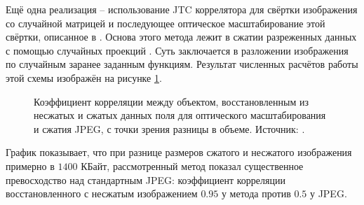 \FloatBarrier\par
Ещё одна реализация -- использование JTC коррелятора для свёртки изображения со случайной матрицей \cite{velez2016optical} и последующее оптическое масштабирование этой свёртки, описанное в \cite{trejos2016optical}. Основа этого метода лежит в сжатии разреженных данных с помощью случайных проекций \cite{amador2007random}. Суть заключается в разложении изображения по случайным заранее заданным функциям. Результат численных расчётов работы этой схемы изображён на рисунке \ref{ris:RandomProjRes}.
\begin{figure}[h]
	\caption{Коэффициент корреляции между объектом, восстановленным из несжатых и сжатых данных поля для оптического масштабирования и сжатия JPEG, с точки зрения разницы в объеме. Источник: \cite{velez2016optical}.}
	\label{ris:RandomProjRes}
\end{figure}
График показывает, что при разнице размеров сжатого и несжатого изображения примерно в $1400$ КБайт, рассмотренный метод показал существенное превосходство над стандартным JPEG: коэффициент корреляции восстановленного с несжатым изображением $0.95$ у метода против $0.5$ у JPEG.





